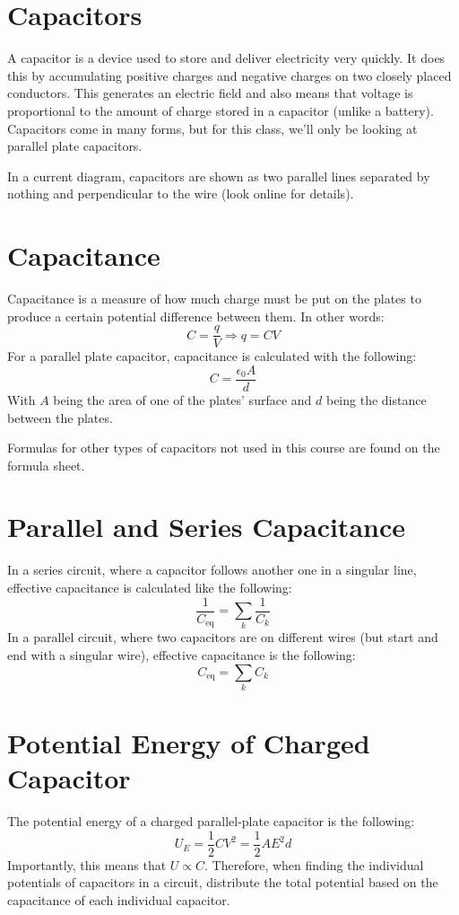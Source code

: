 \documentclass[]{article}
\begin{document}
\section{Capacitors}
A capacitor is a device used to store and deliver electricity very quickly. It does this by accumulating positive charges and negative charges on two closely placed conductors. This generates an electric field and also means that voltage is proportional to the amount of charge stored in a capacitor (unlike a battery). Capacitors come in many forms, but for this class, we'll only be looking at parallel plate capacitors.

In a current diagram, capacitors are shown as two parallel lines separated by nothing and perpendicular to the wire (look online for details).

\section{Capacitance}
Capacitance is a measure of how much charge must be put on the plates to produce a certain potential difference between them. In other words:
\[ C = \frac{q}{V} \Rightarrow q = CV \]
For a parallel plate capacitor, capacitance is calculated with the following:
\[ C = \frac{\epsilon_0 A}{d} \]
With $ A $ being the area of one of the plates' surface and $ d $ being the distance between the plates.

Formulas for other types of capacitors not used in this course are found on the formula sheet.

\section{Parallel and Series Capacitance}
In a series circuit, where a capacitor follows another one in a singular line, effective capacitance is calculated like the following:
\[ \frac{1}{C_{\text{eq}}} = \sum_{k}\frac{1}{C_k} \]
In a parallel circuit, where two capacitors are on different wires (but start and end with a singular wire), effective capacitance is the following:
\[ C_{\text{eq}} = \sum_{k} C_k \]

\section{Potential Energy of Charged Capacitor}
The potential energy of a charged parallel-plate capacitor is the following:
\[ U_E = \frac{1}{2} C V^2 = \frac{1}{2} A E^2 d \]
Importantly, this means that $ U \propto C $. Therefore, when finding the individual potentials of capacitors in a circuit, distribute the total potential based on the capacitance of each individual capacitor.
\end{document}
